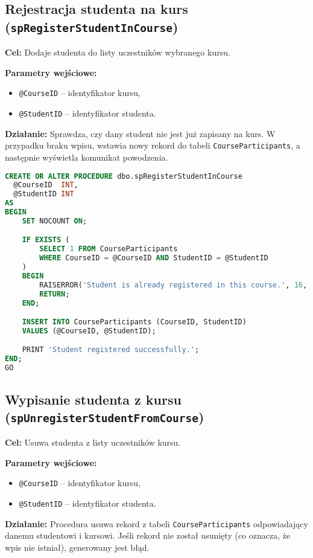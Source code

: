 \documentclass[12pt]{article}
\begin{document}
\newpage
\subsection{Rejestracja studenta na kurs (\texttt{spRegisterStudentInCourse})}
\textbf{Cel:} Dodaje studenta do listy uczestników wybranego kursu.

\textbf{Parametry wejściowe:}
\begin{itemize}
  \item \texttt{@CourseID} – identyfikator kursu,
  \item \texttt{@StudentID} – identyfikator studenta.
\end{itemize}

\textbf{Działanie:} Sprawdza, czy dany student nie jest już zapisany na kurs. W przypadku braku wpisu, wstawia nowy rekord do tabeli \verb|CourseParticipants|, a następnie wyświetla komunikat powodzenia.

\begin{lstlisting}[language=SQL]
CREATE OR ALTER PROCEDURE dbo.spRegisterStudentInCourse
  @CourseID  INT,
  @StudentID INT
AS
BEGIN
    SET NOCOUNT ON;

    IF EXISTS (
        SELECT 1 FROM CourseParticipants
        WHERE CourseID = @CourseID AND StudentID = @StudentID
    )
    BEGIN
        RAISERROR('Student is already registered in this course.', 16, 1);
        RETURN;
    END;

    INSERT INTO CourseParticipants (CourseID, StudentID)
    VALUES (@CourseID, @StudentID);

    PRINT 'Student registered successfully.';
END;
GO
\end{lstlisting}
\newpage
\subsection{Wypisanie studenta z kursu (\texttt{spUnregisterStudentFromCourse})}
\textbf{Cel:} Usuwa studenta z listy uczestników kursu.

\textbf{Parametry wejściowe:}
\begin{itemize}
  \item \texttt{@CourseID} – identyfikator kursu,
  \item \texttt{@StudentID} – identyfikator studenta.
\end{itemize}

\textbf{Działanie:} Procedura usuwa rekord z tabeli \verb|CourseParticipants| odpowiadający danemu studentowi i kursowi. Jeśli rekord nie został usunięty (co oznacza, że wpis nie istniał), generowany jest błąd.
\end{document}

